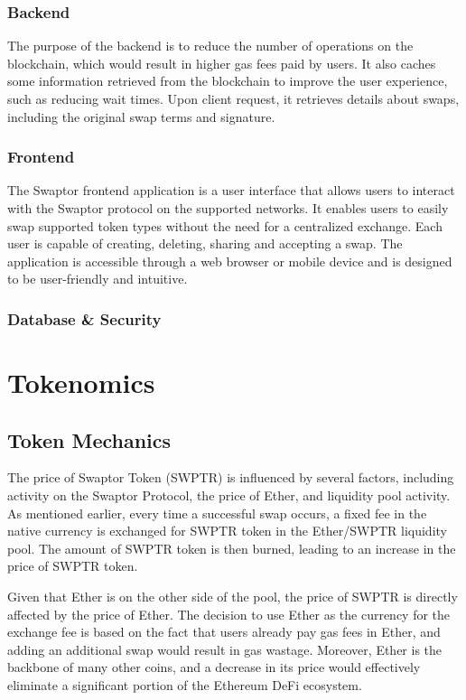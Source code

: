 \documentclass[12pt]{article}
\begin{document}
  \subsubsection{Backend}
  The purpose of the backend is to reduce the number of operations on the blockchain,
  which would result in higher gas fees paid by users. It also caches some information
  retrieved from the blockchain to improve the user experience, such as reducing wait
  times. Upon client request, it retrieves details about swaps, including the original
  swap terms and signature.

  \subsubsection{Frontend}
  The Swaptor frontend application is a user interface that allows users to interact
  with the Swaptor protocol on the supported networks. It enables users to easily swap
  supported token types without the need for a centralized exchange. Each user is capable 
  of creating, deleting, sharing and accepting a swap. The application is accessible through a 
  web browser or mobile device and is designed to be user-friendly and intuitive.

  \subsubsection{Database \& Security}

  \section{Tokenomics}

  \subsection{Token Mechanics}

  The price of Swaptor Token (SWPTR) is influenced by several factors,
  including activity on the Swaptor Protocol, the price of Ether,
  and liquidity pool activity. As mentioned earlier, every time a
  successful swap occurs, a fixed fee in the native currency is
  exchanged for SWPTR token in the Ether/SWPTR liquidity pool.
  The amount of SWPTR token is then burned, leading to an increase
  in the price of SWPTR token.

  Given that Ether is on the other side of the pool, the price of
  SWPTR is directly affected by the price of Ether. The decision to
  use Ether as the currency for the exchange fee is based on the fact
  that users already pay gas fees in Ether, and adding an additional
  swap would result in gas wastage. Moreover, Ether is the backbone of
  many other coins, and a decrease in its price would effectively
  eliminate a significant portion of the Ethereum DeFi ecosystem.
\end{document}
